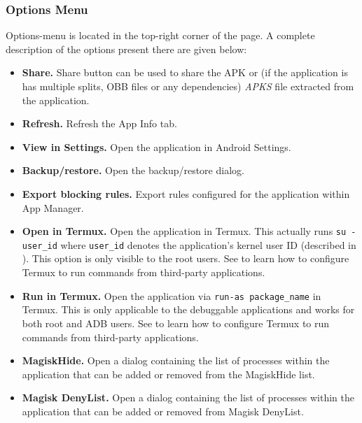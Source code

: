 \subsubsection{Options Menu}\label{subsubsec:app-info-options-menu} %
Options-menu is located in the top-right corner of the page. A complete description of the options present there are
given below:
\begin{itemize}
    \item \textbf{Share.} Share button can be used to share the APK or (if the application is has multiple splits, OBB
    files or any dependencies) \textit{APKS} file extracted from the application.

    \item \textbf{Refresh.} Refresh the App Info tab.

    \item \textbf{View in Settings.} Open the application in Android Settings.

    \item \textbf{Backup/restore.} Open the backup/restore dialog.

    \item \textbf{Export blocking rules.} Export rules configured for the application within App Manager.

    \item \textbf{Open in Termux.} Open the application in Termux. This actually runs \texttt{su - user\_id} where
    \texttt{user\_id} denotes the application's kernel user ID (described in ).
    This option is only visible to the root users. See  to learn how to configure Termux
    to run commands from third-party applications.

    \item \textbf{Run in Termux.} Open the application via \texttt{run-as package\_name} in Termux. This is only
    applicable to the debuggable applications and works for both root and ADB users. See 
    to learn how to configure Termux to run commands from third-party applications.

    \item \textbf{MagiskHide.} Open a dialog containing the list of processes within the application that can be added
    or removed from the MagiskHide list.

    \item \textbf{Magisk DenyList.} Open a dialog containing the list of processes within the application that can be
    added or removed from Magisk DenyList.


\end{itemize}
